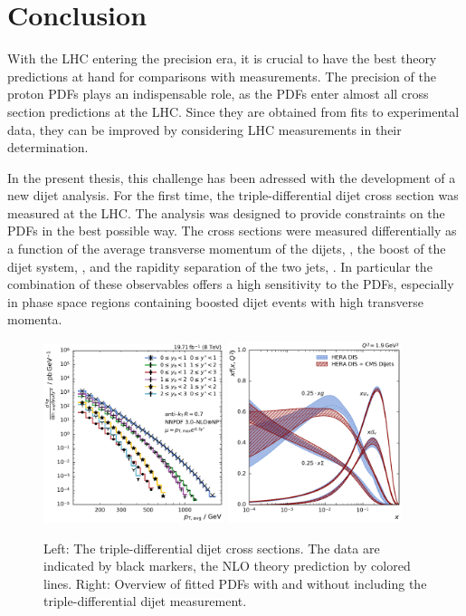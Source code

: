 
\chapter{Conclusion}

With the LHC entering the precision era, it is crucial to have the best
theory predictions at hand for comparisons with measurements. The precision of
the proton PDFs plays an indispensable role, as the PDFs enter almost all cross section
predictions at the LHC. Since they are obtained from fits to experimental data,
they can be improved by considering LHC measurements in their
determination.

In the present thesis, this challenge has been adressed with the development of a new
dijet analysis. For the first time, the triple-differential dijet cross section was
measured at the LHC. The analysis was designed to provide constraints on the PDFs in
the best possible way. The cross sections were measured differentially as
a function of the average transverse momentum of the dijets, \ptavg, the boost
of the dijet system, \yboost, and the rapidity separation of the two jets,
\ystar. In particular the combination of these
observables offers a high sensitivity to the PDFs, especially in phase space
regions containing boosted dijet events with high transverse momenta.


\begin{figure}[h!tbp]
    \centering
    \includegraphics[width=0.47\textwidth]{figures/measurement/ptavg_spectrum.pdf}\hfill
    \includegraphics[width=0.45\textwidth]{figures/pdf_constraints/pdfcomp_direct_overview_1.9.pdf}
    \caption[Summary plot of results]{Left:
    The triple-differential dijet cross sections. The data are indicated by black
    markers, the NLO theory prediction by colored lines. Right: Overview of
    fitted PDFs with and without including the triple-differential dijet
    measurement.}
    \label{fig:conclusion}
\end{figure}

